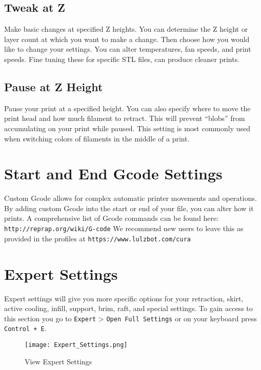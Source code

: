 \subsection{Tweak at Z}
Make basic changes at specified Z heights. You can determine the Z height or layer count at which you want to make a change. Then choose how you would like to change your settings. You can alter temperatures, fan speeds, and print speeds. Fine tuning these for specific STL files, can produce cleaner prints.

\subsection{Pause at Z Height}
Pause your print at a specified height. You can also specify where to move the print head and how much filament to retract. This will prevent “blobs” from accumulating on your print while paused. This setting is most commonly used when switching colors of filaments in the middle of a print.

\section{Start and End Gcode Settings}
Custom Gcode allows for complex automatic printer movements and operations. By adding custom Gcode into the start or end of your file, you can alter how it prints. A comprehensive list of Gcode commands can be found here: \texttt{http://reprap.org/wiki/G-code} We recommend new users to leave this as provided in the profiles at \texttt{https://www.lulzbot.com/cura}


\section{Expert Settings}
Expert settings will give you more specific options for your retraction, skirt, active cooling, infill, support, brim, raft, and special settings. To gain access to this section you go to \texttt{Expert} > \texttt{Open Full Settings} or on your keyboard press \texttt{Control + E}.
\begin{figure}[H]
\centering
\texttt{[image: Expert\_Settings.png]}
\caption{View Expert Settings}
\label{fig:Expert Settings}
\end{figure}


